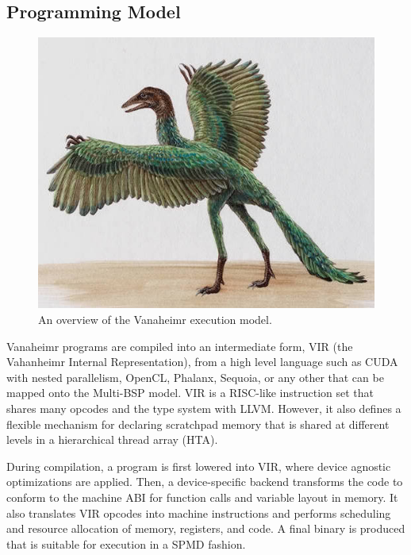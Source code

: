 \documentclass[conference, 10pt]{IEEEtran}
\begin{document}
\subsection{Programming Model}

\begin{figure}
	\begin{center}
		\includegraphics[width=0.9\linewidth]{archaeopteryx-bird}
		\caption{An overview of the Vanaheimr execution model.}
		\label{fig:vanaheimr-execution-model}
	\end{center}
\end{figure}

Vanaheimr programs are compiled into an intermediate form, VIR (the Vahanheimr
Internal Representation), from a high level language such as CUDA with nested
parallelism, OpenCL, Phalanx, Sequoia, or any other that can be mapped onto
the Multi-BSP model. VIR is a RISC-like instruction set that shares many opcodes
and the type system with LLVM.  However, it also defines a flexible mechanism
for declaring scratchpad memory that is shared at different levels in a 
hierarchical thread array (HTA).  

During compilation, a program is first lowered into VIR, where device agnostic
optimizations are applied. Then, a device-specific backend transforms the code
to conform to the machine ABI for function calls and variable layout in memory. 
It also translates VIR opcodes into machine instructions and performs scheduling
and resource allocation of memory, registers, and code.  A final binary is
produced that is suitable for execution in a SPMD fashion.
\end{document}
